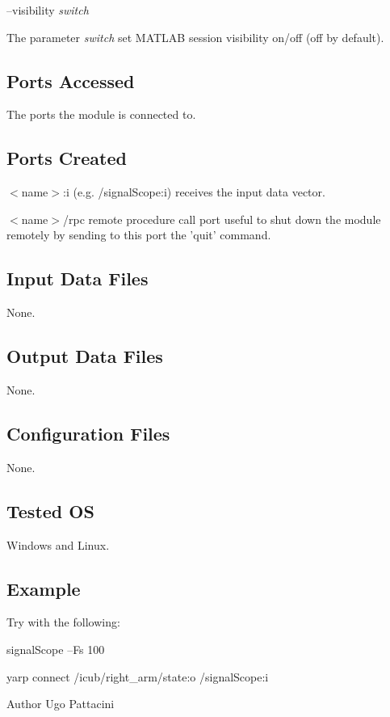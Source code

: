 --visibility {\itshape switch} 
\begin{DoxyItemize}
\item The parameter {\itshape switch} set M\+A\+T\+L\+A\+B session visibility on/off (off by default).
\end{DoxyItemize}\hypertarget{group__signalScope_portsa_sec}{}\subsection{Ports Accessed}\label{group__signalScope_portsa_sec}
The ports the module is connected to.\hypertarget{group__icub__tld_portsc_sec}{}\subsection{Ports Created}\label{group__icub__tld_portsc_sec}

\begin{DoxyItemize}
\item {\itshape } $<$name$>$\+:i (e.\+g. /signal\+Scope\+:i) receives the input data vector.
\item {\itshape } $<$name$>$/rpc remote procedure call port useful to shut down the module remotely by sending to this port the 'quit' command.
\end{DoxyItemize}\hypertarget{group__signalScope_in_files_sec}{}\subsection{Input Data Files}\label{group__signalScope_in_files_sec}
None.\hypertarget{group__signalScope_out_data_sec}{}\subsection{Output Data Files}\label{group__signalScope_out_data_sec}
None.\hypertarget{group__signalScope_conf_file_sec}{}\subsection{Configuration Files}\label{group__signalScope_conf_file_sec}
None.\hypertarget{group__icub__tld_tested_os_sec}{}\subsection{Tested O\+S}\label{group__icub__tld_tested_os_sec}
Windows and Linux.\hypertarget{group__signalScope_example_sec}{}\subsection{Example}\label{group__signalScope_example_sec}
Try with the following\+:


\begin{DoxyItemize}
\item signal\+Scope --Fs 100
\item yarp connect /icub/right\+\_\+arm/state\+:o /signal\+Scope\+:i 
\end{DoxyItemize}

\begin{DoxyAuthor}{Author}
Ugo Pattacini 
\end{DoxyAuthor}
